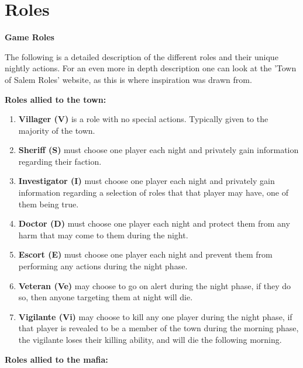 \section{Roles}\label{app:A}
\begin{center}
	\textbf{Game Roles}
\end{center}
The following is a detailed description of the 
different roles and their unique nightly actions. For 
an even more in depth description one can look at the 
'Town of Salem Roles' website, as this is where 
inspiration was drawn from\cite{TownOfSalemRoles}.

\textbf{Roles allied to the town:}
\begin{enumerate}
	\item\textbf{Villager (V)} is a  role with no special actions. Typically
	      given
	      to the majority of the town.
	\item\textbf{Sheriff (S)} must choose one player each night and privately
	      gain
	      information regarding their faction.
	\item\textbf{Investigator (I)} must choose one player each night and
	      privately
	      gain information regarding a selection of roles that that player may have,
	      one of them being true.
	\item\textbf{Doctor (D)} must choose one player each night and protect them
	      from any harm that may come to them during the night.
	\item\textbf{Escort (E)} must choose one player each night and prevent them
	      from performing any actions during the night phase.
	\item\textbf{Veteran (Ve)} may choose to go on alert during the night
	      phase, if
	      they do so, then anyone targeting them at night will die.
	\item\textbf{Vigilante (Vi)} may choose to kill any one player during the
	      night
	      phase, if that player is revealed to be a member of the town during the
	      morning phase, the vigilante loses their killing ability, and will die the
	      following morning.
\end{enumerate}
\textbf{Roles allied to the mafia:}
